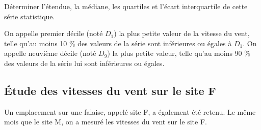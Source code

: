 \begin{questions}
	\question
	
	
	\question Déterminer l'étendue, la médiane, les quartiles et l'écart interquartile de cette série statistique.
	
	\question On appelle premier décile (noté $D_1$) la plus petite valeur de la vitesse du vent, telle qu'au moins 10 \% des valeurs de la série sont inférieures ou égales à $D_1$. On appelle neuvième décile (noté $D_9$) la plus petite valeur, telle qu'au moins 90 \% des valeurs de la série lui sont inférieures ou égales.
	
\end{questions}

\subsection{\'Etude des vitesses du vent sur le site F}\label{part:site_F}

Un emplacement sur une falaise, appelé site F, a également été retenu. Le même mois que le site M, on a mesuré les vitesses du vent sur le site F.

